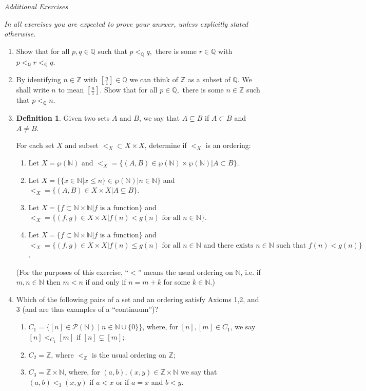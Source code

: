\documentclass[11pt]{article}
\newcommand{\bbN}{\mathbb{N}}
\newcommand{\bbQ}{\mathbb{Q}}
\newcommand{\bbZ}{\mathbb{Z}}
\renewcommand{\_}[1]{\underline{ #1 }}
\theoremstyle{definition}
\newtheorem{definition}[theorem]{Definition}
\numberwithin{equation}{subsection}
\begin{document}
\begin{center}
{\em Additional Exercises}
\end{center} 

{\em In all exercises you are expected to prove your answer, unless explicitly stated otherwise.}

\begin{enumerate}

\item Show that for all $p,q\in \bbQ$ such that $p<_{\bbQ}q,$ there is some $r\in \bbQ$ with $p<_{\bbQ} r <_{\bbQ}q.$



\item By identifying $n\in \bbZ$ with $[\frac{n}{1}]\in \bbQ$ we can think of $\bbZ$ as a subset of $\bbQ.$ 
We shall write $n$ to mean $[\frac{n}{1}].$ Show that for all $p\in \bbQ,$ there is some 
$n\in \bbZ$ such that $p<_{\bbQ} n.$




\item


\begin{definition}
	Given two sets $A$ and $B$, we say that $A\subsetneq B$ if $A\subset B$ and $A\neq B$.
\end{definition}

For each set $X$ and subset $<_X \subset X\times X$, determine if $<_X$ is an ordering:
\begin{enumerate}
\item Let $X = \wp(\bbN)$ and $<_X = \{(A,B) \in \wp(\bbN)\times\wp(\bbN) | A \subset B\}$.
\item Let $X = \big\{ \{x \in \bbN | x \leq n\} \in \wp(\bbN) | n \in \bbN \big\}$ and $<_X = \{ (A, B)\in X\times X | A \subsetneq B\}$.
\item Let $X = \{ f \subset \bbN \times \bbN | f \text{ is a function}\}$ and $<_X = \{ (f,g) \in X\times X | f(n) < g(n) \text{ for all }n\in\bbN\}$.
\item Let $X = \{ f \subset \bbN \times \bbN | f \text{ is a function}\}$ and $<_X = \{ (f,g) \in X\times X | f(n) \leq g(n) \text{ for all }n\in\bbN \text{ and there exists } n\in\bbN \text{ such that } f(n) < g(n)\}$.
\end{enumerate}
(For the purposes of this exercise, ``$<$'' means the usual ordering on $\bbN$, i.e. if $m,n\in\bbN$ then $m < n$ if and only if $n = m+k$ for some $k\in\bbN$.)

\item
	Which of the following pairs of a set and an ordering satisfy Axioms 1,2, and 3 (and are thus examples of a ``continuum'')?
	\begin{enumerate}
		\item[i)] $C_1 = \{[n] \in \mathcal{P}(\bbN) \mid n \in \bbN\cup\{0\}\}$, where, for $[n], [m] \in C_1$, we say $[n] <_{C_1} [m]$ if $[n] \subsetneq [m]$;
		\item[ii)] $C_2 = \bbZ$, where $<_\bbZ$ is the usual ordering on $\bbZ$;
		\item[iii)] $C_3 = \bbZ\times \bbN$, where, for $(a,b), (x,y) \in \bbZ\times\bbN$ we say that $(a,b) <_3 (x,y)$ if $a < x$ or if $a=x$ and $b < y$.
	\end{enumerate}



\end{enumerate}
\end{document}
